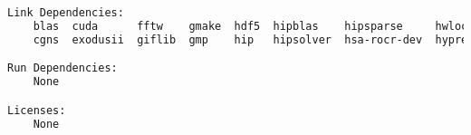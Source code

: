 {\begin{lstlisting}[language=bash]
Link Dependencies:
    blas  cuda      fftw    gmake  hdf5  hipblas    hipsparse     hwloc  jpeg    kokkos-kernels  libpng  libyaml      memkind  mkl  moab  mpi    netcdf-c  parallel-netcdf  parmmg     rocblas    rocprim  rocsolver  rocthrust  scalapack  sowing     suite-sparse  tetgen    valgrind  zoltan
    cgns  exodusii  giflib  gmp    hip   hipsolver  hsa-rocr-dev  hypre  kokkos  lapack          libx11  llvm-amdgpu  metis    mmg  mpfr  mumps  p4est     parmetis         random123  rocm-core  rocrand  rocsparse  saws       scotch     strumpack  superlu-dist  trilinos  zlib-api

Run Dependencies:
    None

Licenses: 
    None
\end{lstlisting}
}
\endinput  %
